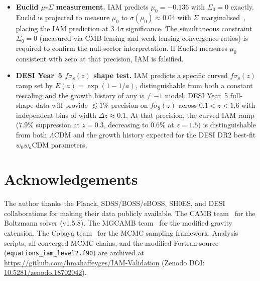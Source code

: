 \documentclass[12pt,a4paper]{article}
\newcommand{\lcdm}{$\Lambda$CDM}
\begin{document}
\begin{itemize}
\item \textbf{Euclid $\mu$-$\Sigma$ measurement.}
  IAM predicts $\mu_0 = -0.136$ with $\Sigma_0 = 0$ exactly.
  Euclid is projected to measure $\mu_0$ to $\sigma(\mu_0) \approx 0.04$
  with $\Sigma$ marginalised~\citep{Euclid2020forecast}, placing the IAM
  prediction at $3.4\sigma$ significance.
  The simultaneous constraint $\Sigma_0 = 0$ (measured via CMB lensing
  and weak lensing convergence ratios) is required to confirm the
  null-sector interpretation.
  If Euclid measures $\mu_0$ consistent with zero at that precision, IAM
  is falsified.

\item \textbf{DESI Year~5 $f\sigma_8(z)$ shape test.}
  IAM predicts a specific curved $f\sigma_8(z)$ ramp set by
  $E(a) = \exp(1-1/a)$, distinguishable from both a constant rescaling
  and the growth history of any $w \neq -1$ model.
  DESI Year~5 full-shape data will provide $\lesssim 1\%$ precision on
  $f\sigma_8(z)$ across $0.1 < z < 1.6$ with independent bins of width
  $\Delta z \approx 0.1$.
  At that precision, the curved IAM ramp ($7.9\%$ suppression at $z = 0.3$,
  decreasing to $0.6\%$ at $z = 1.5$) is distinguishable from both
  \lcdm{} and the growth history expected for the DESI DR2 best-fit
  $w_0 w_a$CDM parameters.
\end{itemize}

\section*{Acknowledgements}

The author thanks the Planck, SDSS/BOSS/eBOSS, SH0ES, and DESI collaborations
for making their data publicly available.
The CAMB team~\citep{Lewis2011camb} for the Boltzmann solver (v1.5.8).
The MGCAMB team~\citep{mgcamb} for the modified gravity extension.
The Cobaya team~\citep{cobaya} for the MCMC sampling framework.
Analysis scripts, all converged MCMC chains, and the modified Fortran
source (\texttt{equations\_iam\_level2.f90}) are archived at
\url{https://github.com/hmahaffeyges/IAM-Validation}
(Zenodo DOI: \href{https://doi.org/10.5281/zenodo.18702042}{10.5281/zenodo.18702042}).




\clearpage
\end{document}
